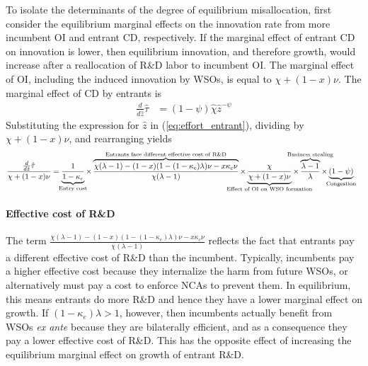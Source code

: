 \documentclass[11pt,english]{article}
\begin{document}
To isolate the determinants of the degree of equilibrium misallocation, first consider the equilibrium marginal effects on the innovation rate from more incumbent OI and entrant CD, respectively. If the marginal effect of entrant CD on innovation is lower, then equilibrium innovation, and therefore growth, would increase after a reallocation of R\&D labor to incumbent OI. The marginal effect of OI, including the induced innovation by WSOs, is equal to $\chi + (1-x) \nu$. The marginal effect of CD by entrants is
\begin{align}
\frac{d}{d\hat{z}} \hat{\tau} &= (1-\psi) \hat{\chi} \hat{z}^{-\psi} \label{eq:marginal_effect_effort_entrant}
\end{align}
%
Substituting the expression for $\hat{z}$ in (\ref{eq:effort_entrant}), dividing by $\chi + (1-x)\nu$, and rearranging yields 
\begin{align}
	\frac{\frac{d}{d\hat{z}} \hat{\tau}}{\chi + (1-x)\nu} &= \underbrace{\frac{1}{1-\kappa_{e}}}_{\mathclap{\text{Entry cost}}} \times \overbrace{\frac{\chi(\lambda-1) -(1-x) (1-(1-\kappa_e)\lambda)\nu - x \kappa_c \nu}{\chi(\lambda-1)}}^{\mathclap{\text{Entrants face different effective cost of R\&D}}} \times \underbrace{\frac{\chi}{\chi + (1-x)\nu}}_{\mathclap{\text{Effect of OI on WSO formation}}} \times \overbrace{\frac{\lambda-1}{\lambda}}^{\mathclap{\text{Business stealing}}} \times  \underbrace{(1-\psi)}_{\mathclap{\text{Congestion}}}  \label{cs:growth_misallocation_condition}
\end{align}

\paragraph{Effective cost of R\&D} 

The term $\frac{\chi(\lambda-1) -(1-x) (1-(1-\kappa_e)\lambda)\nu - x \kappa_c \nu}{\chi(\lambda-1)}$ reflects the fact that entrants pay a different effective cost of R\&D than the incumbent. Typically, incumbents pay a higher effective cost because they internalize the harm from future WSOs, or alternatively must pay a cost to enforce NCAs to prevent them. In equilibrium, this means entrants do more R\&D and hence they have a lower marginal effect on growth. If $(1-\kappa_e) \lambda > 1$, however, then incumbents actually benefit from WSOs \textit{ex ante} because they are bilaterally efficient, and as a consequence they pay a lower effective cost of R\&D. This has the opposite effect of increasing the equilibrium marginal effect on growth of entrant R\&D. 
\end{document}
